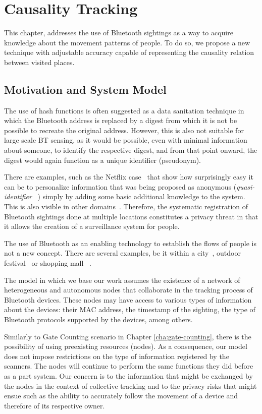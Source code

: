 \chapter{Causality Tracking}
\label{cha:causality-tracking}
This chapter, addresses the use of Bluetooth sightings as a way to
acquire knowledge about the movement patterns of people. To do so, we
propose a new technique with adjustable accuracy capable of
representing the causality relation between visited places.

\section{Motivation and System Model}
\label{sec:ct-motivation}

The use of hash functions is often suggested as a data sanitation
technique in which the Bluetooth address is replaced by a digest from
which it is not be possible to recreate the original address. However,
this is also not suitable for large scale BT sensing, as it would be
possible, even with minimal information about someone, to identify the
respective digest, and from that point onward, the digest would again
function as a unique identifier (pseudonym).

There are examples, such as the Netflix
case~\cite{DBLP:journals/corr/abs-cs-0610105} that show how
surprisingly easy it can be to personalize information that was being
proposed as anonymous (\emph{quasi-identifier}
~\cite{bettini2005protecting}) simply by adding some basic additional
knowledge to the system. This is also visible in other
domains~\cite{Ohm:2010tc}. Therefore, the systematic registration of
Bluetooth sightings done at multiple locations constitutes a privacy
threat in that it allows the creation of a surveillance system for
people.

The use of Bluetooth as an enabling technology to establish the flows
of people is not a new concept. There are several examples, be it
within a city~\cite{Oneill:2006vq}, outdoor
festival~\cite{versichele2012use} or shopping mall
~\cite{millonig2008shadowing}.

The model in which we base our work assumes the existence of a network
of heterogeneous and autonomous nodes that collaborate in the
tracking process of Bluetooth devices. These nodes may have access to
various types of information about the devices: their MAC address, the
timestamp of the sighting, the type of Bluetooth protocols supported
by the devices, among others.

Similarly to Gate Counting scenario in Chapter
\ref{cha:gate-counting}, there is the possibility of using preexisting
resources (nodes). As a consequence, our model does not impose
restrictions on the type of information registered by the
scanners. The nodes will continue to perform the same functions they
did before as a part system. Our concern is to the information that
might be exchanged by the nodes in the context of collective tracking
and to the privacy risks that might ensue such as the ability
to accurately follow the movement of a device and therefore of its
respective owner.

